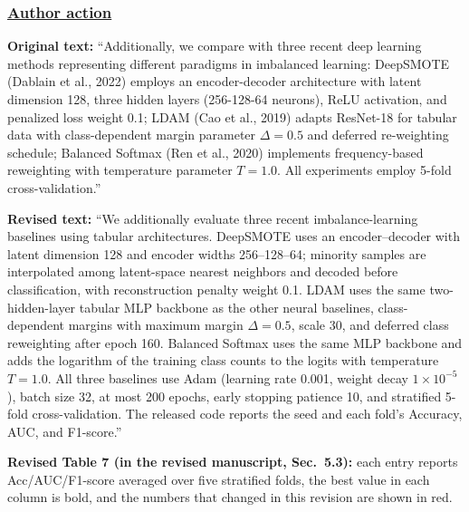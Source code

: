 \documentclass[journal,12pt, onecolumn]{IEEEtran}
\begin{document}
{\color{black}
\subsubsection*{\textbf{\underline{Author action}}}
\begin{center}
{\color{red}}
\end{center}
\textbf{Original text:} ``Additionally, we compare with three recent deep learning methods representing different paradigms in imbalanced learning: DeepSMOTE (Dablain et al., 2022) employs an encoder-decoder architecture with latent dimension 128, three hidden layers (256-128-64 neurons), ReLU activation, and penalized loss weight 0.1; LDAM (Cao et al., 2019) adapts ResNet-18 for tabular data with class-dependent margin parameter $\Delta=0.5$ and deferred re-weighting schedule; Balanced Softmax (Ren et al., 2020) implements frequency-based reweighting with temperature parameter $T=1.0$. All experiments employ 5-fold cross-validation.''

\textbf{Revised text:} ``{\color{red}We additionally evaluate three recent imbalance-learning baselines using tabular architectures. DeepSMOTE uses an encoder--decoder with latent dimension 128 and encoder widths 256--128--64; minority samples are interpolated among latent-space nearest neighbors and decoded before classification, with reconstruction penalty weight 0.1. LDAM uses the same two-hidden-layer tabular MLP backbone as the other neural baselines, class-dependent margins with maximum margin $\Delta=0.5$, scale 30, and deferred class reweighting after epoch 160. Balanced Softmax uses the same MLP backbone and adds the logarithm of the training class counts to the logits with temperature $T=1.0$. All three baselines use Adam (learning rate 0.001, weight decay $1\times10^{-5}$), batch size 32, at most 200 epochs, early stopping patience 10, and stratified 5-fold cross-validation. The released code reports the seed and each fold's Accuracy, AUC, and F1-score.}''

\noindent\textbf{Revised Table 7 (in the revised manuscript, Sec.~5.3):} each entry reports Acc/AUC/F1-score averaged over five stratified folds, the best value in each column is bold, and the numbers that changed in this revision are shown in red.

}
\end{document}
